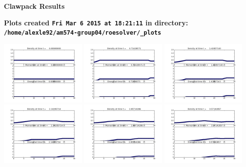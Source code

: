 \documentclass[11pt]{article}
\begin{document}
        \begin{center}{\Large\bf Clawpack Results}\vskip 5pt
        
        \bf Plots created {\tt Fri Mar  6 2015 at 18:21:11} in directory: \vskip 5pt
        \verb+/home/alexle92/am574-group04/roesolver/_plots+
        \end{center}
        \vskip 5pt
        \includegraphics[width=0.316666666667\textwidth]{frame0000fig1.png}
\vskip 10pt 
\includegraphics[width=0.316666666667\textwidth]{frame0001fig1.png}
\vskip 10pt 
\includegraphics[width=0.316666666667\textwidth]{frame0002fig1.png}
\vskip 10pt 
\includegraphics[width=0.316666666667\textwidth]{frame0003fig1.png}
\vskip 10pt 
\includegraphics[width=0.316666666667\textwidth]{frame0004fig1.png}
\vskip 10pt 
\includegraphics[width=0.316666666667\textwidth]{frame0005fig1.png}
\end{document}
